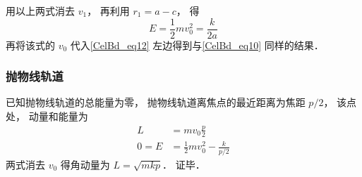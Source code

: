用以上两式消去 $v_1$， 再利用 $r_1 = a - c$， 得
\begin{equation}\label{CelBd_eq13}
E = \frac 12 m v_0^2 = \frac{k}{2a}
\end{equation}
再将该式的 $v_0$ 代入\autoref{CelBd_eq12} 左边得到与\autoref{CelBd_eq10} 同样的结果．

\subsubsection{抛物线轨道}
已知抛物线轨道的总能量为零， 抛物线轨道离焦点的最近距离为焦距 $p/2$， 该点处， 动量和能量为
\begin{align}
L &= mv_0 \frac p2\\
0 = E &= \frac 12 mv_0^2 - \frac{k}{p/2}
\end{align}
两式消去 $v_0$ 得角动量为 $L = \sqrt{mkp}$． 证毕．
